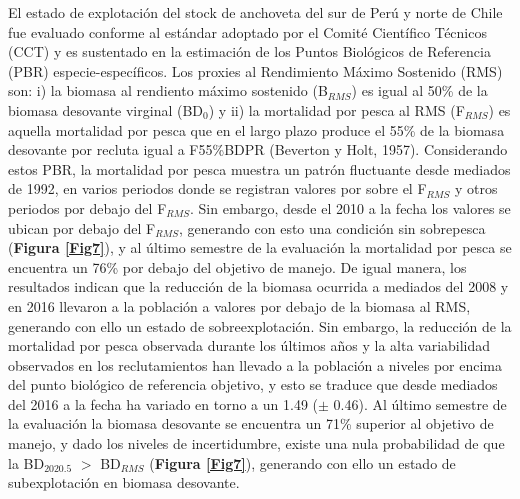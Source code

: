 \documentclass[letter,11pt]{article}
\begin{document}
El estado de explotaci\'on del stock de anchoveta del sur de Per\'u y norte
de Chile fue evaluado conforme al est\'andar adoptado por el Comit\'e
Cient\'ifico T\'ecnicos (CCT) y es sustentado en la estimaci\'on de los Puntos
Biol\'ogicos de Referencia (PBR) especie-espec\'ificos. Los proxies al
Rendimiento M\'aximo Sostenido (RMS) son: i) la biomasa al rendiento
m\'aximo sostenido (B$_{RMS}$) es igual al 50\% de la biomasa desovante
virginal (BD$_{0}$) y ii) la mortalidad por pesca al RMS (F$_{RMS}$)
es aquella mortalidad por pesca que en el largo plazo produce el 55\% de
la biomasa desovante por recluta igual a F55\%BDPR (Beverton y Holt,
1957). Considerando estos PBR, la mortalidad por pesca muestra un patr\'on
fluctuante desde mediados de 1992, en varios periodos donde se registran
valores por sobre el F$_{RMS}$ y otros periodos por debajo del
F$_{RMS}$. Sin embargo, desde el 2010 a la fecha los valores se ubican
por debajo del F$_{RMS}$, generando con esto una condici\'on sin
sobrepesca (\textbf{Figura \ref{Fig7}}), y al \'ultimo semestre de la
evaluaci\'on la mortalidad por pesca se encuentra un 76\% por debajo del
objetivo de manejo. De igual manera, los resultados indican que la
reducci\'on de la biomasa ocurrida a mediados del 2008 y en 2016 llevaron
a la poblaci\'on a valores por debajo de la biomasa al RMS, generando con
ello un estado de sobreexplotaci\'on. Sin embargo, la reducci\'on de la
mortalidad por pesca observada durante los \'ultimos a\~{n}os y la alta
variabilidad observados en los reclutamientos han llevado a la poblaci\'on
a niveles por encima del punto biol\'ogico de referencia objetivo, y esto
se traduce que desde mediados del 2016 a la fecha ha variado en torno a
un 1.49 ($\pm$ 0.46). Al \'ultimo semestre de la evaluaci\'on la biomasa
desovante se encuentra un 71\% superior al objetivo de manejo, y dado
los niveles de incertidumbre, existe una nula probabilidad de que la
BD$_{2020.5}$ $>$ BD$_{RMS}$ (\textbf{Figura \ref{Fig7}}),
generando con ello un estado de subexplotaci\'on en biomasa desovante.
\end{document}

